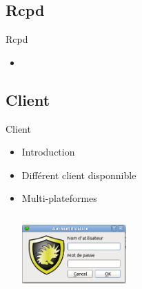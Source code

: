 \documentclass[t,12pt]{beamer}
\begin{document}
	  \subsection{Rcpd}
	  \begin{frame}                                                         %
	      \begin{center}{\textcolor{grisbleu}{\Large Rcpd}}\end{center} %
	      \begin{itemize}                                                   %
		\item
	  \end{itemize}
	  \end{frame} 

	  \subsection{Client}
	  \begin{frame}                                                         %
	      \begin{center}{\textcolor{grisbleu}{\Large Client}}\end{center} %
	      \begin{itemize}                                                   %
		\item Introduction
		\newline
		\item Différent client disponnible
		\newline
		\item Multi-plateformes
		\newline
		\begin{center}\includegraphics[width=4cm,height=3cm]{images/nuapp.png}\end{center}
	  \end{itemize}
	  \end{frame} 
\end{document}
